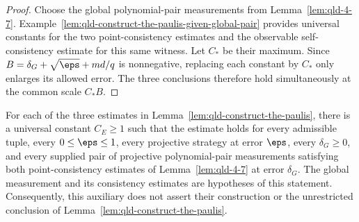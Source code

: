 \begin{proof}
	\leanok
	Choose the global polynomial-pair measurements from
	Lemma~\ref{lem:qld-4-7}. Example~\ref{lem:qld-construct-the-paulis-given-global-pair}
	provides universal constants for the two point-consistency estimates and the
	observable self-consistency estimate for this same witness. Let $C_*$ be their
	maximum. Since $B=\delta_G+\sqrt\eps+md/q$ is nonnegative, replacing each
	constant by $C_*$ only enlarges its allowed error. The three conclusions
	therefore hold simultaneously at the common scale $C_*B$.
\end{proof}

\begin{example}
	\label{lem:qld-construct-the-paulis-given-global-pair}
	\leanok
	For each of the three estimates in Lemma~\ref{lem:qld-construct-the-paulis},
	there is a universal constant $C_E\geq1$ such that the estimate holds for
	every admissible tuple, every $0\leq\eps\leq1$, every projective strategy at
	error $\eps$, every $\delta_G\geq0$, and every supplied pair of projective
	polynomial-pair measurements satisfying both point-consistency estimates of
	Lemma~\ref{lem:qld-4-7} at error $\delta_G$.
	The global measurement and its consistency estimates are hypotheses of this
	statement. Consequently, this auxiliary does not assert their construction
	or the unrestricted conclusion of Lemma~\ref{lem:qld-construct-the-paulis}.
\end{example}
